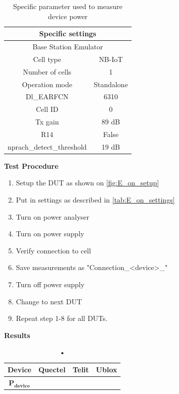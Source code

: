 \begin{table}[H]
\centering
\begin{tabular}{|c|c|} \hline
\multicolumn{2}{|c|}{\textbf{Specific settings}} \\ \hline
\multicolumn{2}{|c|}{Base Station Emulator} \\ \hline
Cell type          & NB-IoT         \\ \hline
Number of cells    & 1              \\ \hline
Operation mode     & Standalone     \\ \hline
Dl\_EARFCN         & 6310           \\ \hline
Cell ID            & 0              \\ \hline
Tx gain            & 89 dB          \\ \hline
R14                & False          \\ \hline
nprach\_detect\_threshold  & 19 dB  \\ \hline
\end{tabular}
\caption{Specific parameter used to measure device power}
\label{tab:E_on_settings}
\end{table}


\textbf{Test Procedure}\\
\begin{enumerate}
\item Setup the \gls{DUT} as shown on \autoref{fig:E_on_setup}
\item Put in settings as described in \autoref{tab:E_on_settings} 
\item Turn on power analyser
\item Turn on power supply 
\item Verify connection to cell
\item Save measurements as "Connection\_<device>\_<Parameters used>"
\item Turn off power supply
\item Change to next \gls{DUT}
\item Repeat step 1-8 for all \gls{DUT}s.
\end{enumerate}


\textbf{Results}\\
\begin{table}[H]
\centering
\begin{tabular}{|c|c|c|c|}\hline
\textbf{Device}	& Quectel	& Telit & Ublox \\ \hline
$\mathbf{P_{device}}$	& & & \\ \hline
\end{tabular}
\caption{•}
\label{tab:device_power_results}
\end{table}

